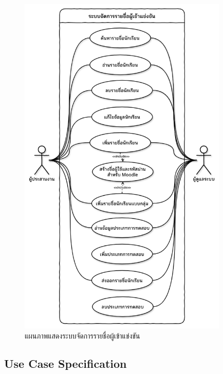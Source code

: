 \begin{figure}[H]
    \centering
    \includegraphics[width=100mm,scale=1.0]{diagrams/package-manage-students.png}
    \caption{แผนภาพแสดงระบบจัดการรายชื่อผู้เข้าแข่งขัน}
    \label{fig:package-manage-students-diagram}
\end{figure}

\subsection{Use Case Specification}



















